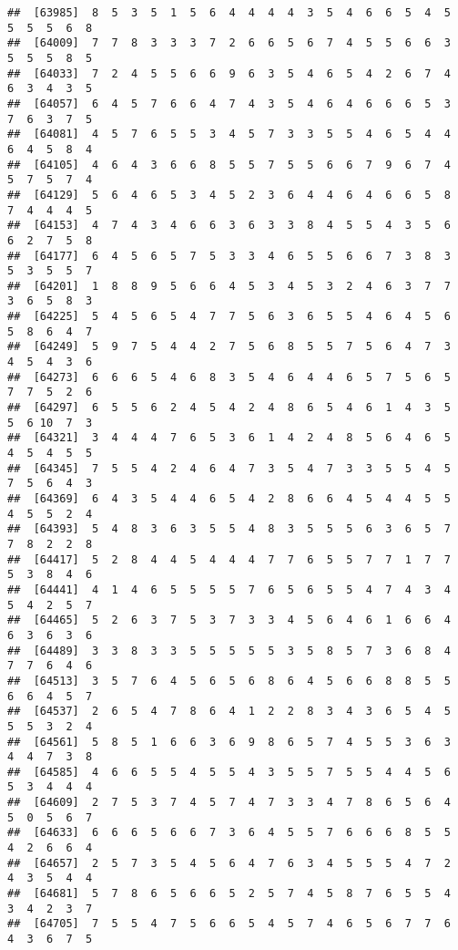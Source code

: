 \documentclass[
]{book}
\begin{document}
\begin{verbatim}
##  [63985]  8  5  3  5  1  5  6  4  4  4  4  3  5  4  6  6  5  4  5  5  5  5  6  8
##  [64009]  7  7  8  3  3  3  7  2  6  6  5  6  7  4  5  5  6  6  3  5  5  5  8  5
##  [64033]  7  2  4  5  5  6  6  9  6  3  5  4  6  5  4  2  6  7  4  6  3  4  3  5
##  [64057]  6  4  5  7  6  6  4  7  4  3  5  4  6  4  6  6  6  5  3  7  6  3  7  5
##  [64081]  4  5  7  6  5  5  3  4  5  7  3  3  5  5  4  6  5  4  4  6  4  5  8  4
##  [64105]  4  6  4  3  6  6  8  5  5  7  5  5  6  6  7  9  6  7  4  5  7  5  7  4
##  [64129]  5  6  4  6  5  3  4  5  2  3  6  4  4  6  4  6  6  5  8  7  4  4  4  5
##  [64153]  4  7  4  3  4  6  6  3  6  3  3  8  4  5  5  4  3  5  6  6  2  7  5  8
##  [64177]  6  4  5  6  5  7  5  3  3  4  6  5  5  6  6  7  3  8  3  5  3  5  5  7
##  [64201]  1  8  8  9  5  6  6  4  5  3  4  5  3  2  4  6  3  7  7  3  6  5  8  3
##  [64225]  5  4  5  6  5  4  7  7  5  6  3  6  5  5  4  6  4  5  6  5  8  6  4  7
##  [64249]  5  9  7  5  4  4  2  7  5  6  8  5  5  7  5  6  4  7  3  4  5  4  3  6
##  [64273]  6  6  6  5  4  6  8  3  5  4  6  4  4  6  5  7  5  6  5  7  7  5  2  6
##  [64297]  6  5  5  6  2  4  5  4  2  4  8  6  5  4  6  1  4  3  5  5  6 10  7  3
##  [64321]  3  4  4  4  7  6  5  3  6  1  4  2  4  8  5  6  4  6  5  4  5  4  5  5
##  [64345]  7  5  5  4  2  4  6  4  7  3  5  4  7  3  3  5  5  4  5  7  5  6  4  3
##  [64369]  6  4  3  5  4  4  6  5  4  2  8  6  6  4  5  4  4  5  5  4  5  5  2  4
##  [64393]  5  4  8  3  6  3  5  5  4  8  3  5  5  5  6  3  6  5  7  7  8  2  2  8
##  [64417]  5  2  8  4  4  5  4  4  4  7  7  6  5  5  7  7  1  7  7  5  3  8  4  6
##  [64441]  4  1  4  6  5  5  5  5  7  6  5  6  5  5  4  7  4  3  4  5  4  2  5  7
##  [64465]  5  2  6  3  7  5  3  7  3  3  4  5  6  4  6  1  6  6  4  6  3  6  3  6
##  [64489]  3  3  8  3  3  5  5  5  5  5  3  5  8  5  7  3  6  8  4  7  7  6  4  6
##  [64513]  3  5  7  6  4  5  6  5  6  8  6  4  5  6  6  8  8  5  5  6  6  4  5  7
##  [64537]  2  6  5  4  7  8  6  4  1  2  2  8  3  4  3  6  5  4  5  5  5  3  2  4
##  [64561]  5  8  5  1  6  6  3  6  9  8  6  5  7  4  5  5  3  6  3  4  4  7  3  8
##  [64585]  4  6  6  5  5  4  5  5  4  3  5  5  7  5  5  4  4  5  6  5  3  4  4  4
##  [64609]  2  7  5  3  7  4  5  7  4  7  3  3  4  7  8  6  5  6  4  5  0  5  6  7
##  [64633]  6  6  6  5  6  6  7  3  6  4  5  5  7  6  6  6  8  5  5  4  2  6  6  4
##  [64657]  2  5  7  3  5  4  5  6  4  7  6  3  4  5  5  5  4  7  2  4  3  5  4  4
##  [64681]  5  7  8  6  5  6  6  5  2  5  7  4  5  8  7  6  5  5  4  3  4  2  3  7
##  [64705]  7  5  5  4  7  5  6  6  5  4  5  7  4  6  5  6  7  7  6  4  3  6  7  5

\end{verbatim}
\end{document}
